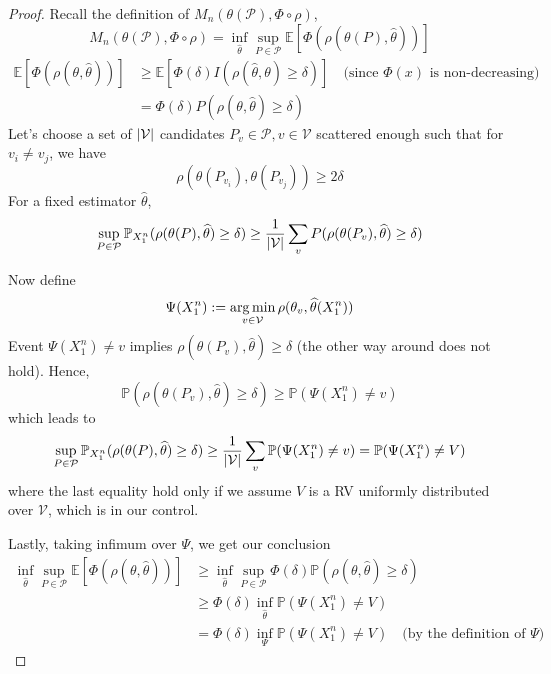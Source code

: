 \documentclass[11pt,a4paper]{article}
\begin{document}
\begin{proof}
    Recall the definition of $M_n(\theta(\mathcal{P}), \Phi \circ \rho)$,
    \[
    M_n(\theta(\mathcal{P}), \Phi \circ \rho) = \inf_{\widehat{\theta}} \sup_{P \in \mathcal{P}} \mathbb{E}[\Phi(\rho(\theta(P), \widehat{\theta}))]
    \] 
    \begin{align*}
    \mathbb{E}[\Phi(\rho(\theta, \widehat{\theta}))] 
    &\geq \mathbb{E} \left[ \Phi(\delta)I(\rho(\widehat{\theta}, \theta)\geq \delta) \right] \quad \text{(since $\Phi(x)$ is non-decreasing)} \\
    &= \Phi(\delta) P(\rho(\theta, \widehat{\theta}) \geq \delta)
    \end{align*}
    Let's choose a set of $\left\lvert\mathcal{V}\right\rvert$ candidates $P_v \in \mathcal{P}, v\in \mathcal{V}$ scattered enough such that for $v_i \neq v_j$, we have
    \[
    \rho(\theta(P_{v_i}), \theta(P_{v_j})) \geq 2\delta
    \] 
    For a fixed estimator $\widehat{\theta}$,
    \begin{align*}
    \sup_{P \in \mathcal{P}} \mathbb{P}_{X_1^{n}} (\rho(\theta(P), \widehat{\theta}) \geq \delta) 
    \geq \dfrac{1}{\left\lvert\mathcal{V}\right\rvert} \sum_{v} P(\rho(\theta(P_{v}), \widehat{\theta}) \geq \delta)
    \end{align*}

    Now define 
    \[
        \Psi(X_1^{n}) := \operatorname*{arg\,min}_{v \in \mathcal{V}} \rho(\theta_v, \widehat{\theta}(X_1^{n}))
    \]
    Event $\Psi(X_1^{n}) \neq v$ implies $\rho(\theta(P_v), \widehat{\theta}) \geq \delta$ (the other way around does not hold). Hence,
    \[
    \mathbb{P}(\rho(\theta(P_v), \widehat{\theta}) \geq \delta) \geq \mathbb{P}(\Psi(X_1^{n}) \neq v)
    \] 
    which leads to
    \[
        \sup_{P \in \mathcal{P}} \mathbb{P}_{X_1^{n}} (\rho(\theta(P), \widehat{\theta}) \geq \delta)  \geq \dfrac{1}{\left\lvert\mathcal{V}\right\rvert} \sum_{v} 
\mathbb{P}(\Psi(X_1^{n}) \neq v)
= \mathbb{P}(\Psi(X_1^{n}) \neq V)
    \] 
    where the last equality hold only if we assume $V$ is a RV uniformly distributed over  $\mathcal{V}$, which is in our control. 

    Lastly, taking infimum over $\Psi$, we get our conclusion
    \begin{align*}
    \inf_{\widehat{\theta}} \sup_{P \in \mathcal{P}} 
    \mathbb{E}[\Phi(\rho(\theta, \widehat{\theta}))] 
    &\geq \inf_{\widehat{\theta}} \sup_{P \in \mathcal{P}} \Phi(\delta) \mathbb{P}(\rho(\theta, \widehat{\theta}) \geq \delta) \\
    &\geq \Phi(\delta) \inf_{\widehat{\theta}}  \mathbb{P}(\Psi(X_1^{n}) \neq V) \\
    &= \Phi(\delta) \inf_{\Psi} \mathbb{P}(\Psi(X_1^{n}) \neq V) \quad \text{(by the definition of $\Psi$)}
    \end{align*} 



\end{proof}
\end{document}
